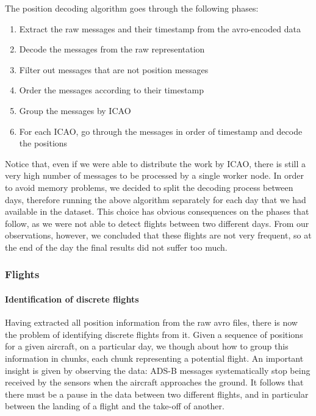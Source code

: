 \documentclass{vldb}
\begin{document}
The position decoding algorithm goes through the following phases:

\begin{enumerate}
  \item Extract the raw messages and their timestamp from the avro-encoded data
  \item Decode the messages from the raw representation
  \item Filter out messages that are not position messages
  \item Order the messages according to their timestamp
  \item Group the messages by ICAO
  \item For each ICAO, go through the messages in order of timestamp and decode
  the positions
\end{enumerate}

Notice that, even if we were able to distribute the work by ICAO, there is still
a very high number of messages to be processed by a single worker node. In order
to avoid memory problems, we decided to split the decoding process between days,
therefore running the above algorithm separately for each day that we had
available in the dataset. This choice has obvious consequences on the phases
that follow, as we were not able to detect flights between two different days.
From our observations, however, we concluded that these flights are not very
frequent, so at the end of the day the final results did not suffer too much.


\subsubsection{Flights}

\paragraph{Identification of discrete flights}

Having extracted all position information from the raw avro files, there is now
the problem of identifying discrete flights from it.
Given a sequence of positions for a given aircraft, on a particular day, we
though about how to group this information in chunks, each chunk representing a
potential flight. An important insight is given by observing the data: ADS-B
messages systematically stop being received by the sensors when the aircraft
approaches the ground. It follows that there must be a pause in the data between
two different flights, and in particular between the landing of a flight and the
take-off of another.
\end{document}
